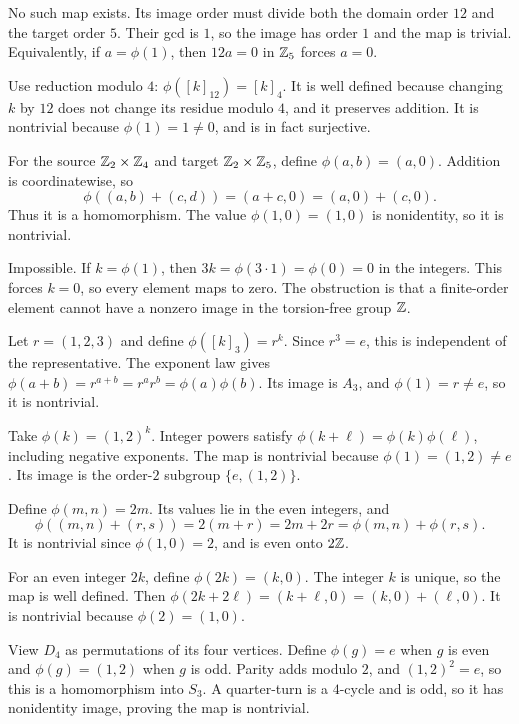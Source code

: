 No such map exists. Its image order must divide both the domain order $12$ and the target order $5$. Their gcd is $1$, so the image has order $1$ and the map is trivial. Equivalently, if $a=\phi(1)$, then $12a=0$ in $\mathbb{Z}_5$ forces $a=0$.

Use reduction modulo $4$: $\phi([k]_{12})=[k]_4$. It is well defined because changing $k$ by $12$ does not change its residue modulo $4$, and it preserves addition. It is nontrivial because $\phi(1)=1\ne0$, and is in fact surjective.

For the source $\mathbb{Z}_2\times\mathbb{Z}_4$ and target $\mathbb{Z}_2\times\mathbb{Z}_5$, define $\phi(a,b)=(a,0)$. Addition is coordinatewise, so
\[\phi((a,b)+(c,d))=(a+c,0)=(a,0)+(c,0).\]
Thus it is a homomorphism. The value $\phi(1,0)=(1,0)$ is nonidentity, so it is nontrivial.

Impossible. If $k=\phi(1)$, then $3k=\phi(3\cdot1)=\phi(0)=0$ in the integers. This forces $k=0$, so every element maps to zero. The obstruction is that a finite-order element cannot have a nonzero image in the torsion-free group $\mathbb{Z}$.

Let $r=(1,2,3)$ and define $\phi([k]_3)=r^k$. Since $r^3=e$, this is independent of the representative. The exponent law gives $\phi(a+b)=r^{a+b}=r^ar^b=\phi(a)\phi(b)$. Its image is $A_3$, and $\phi(1)=r\ne e$, so it is nontrivial.

Take $\phi(k)=(1,2)^k$. Integer powers satisfy $\phi(k+\ell)=\phi(k)\phi(\ell)$, including negative exponents. The map is nontrivial because $\phi(1)=(1,2)\ne e$. Its image is the order-$2$ subgroup $\{e,(1,2)\}$.

Define $\phi(m,n)=2m$. Its values lie in the even integers, and
\[\phi((m,n)+(r,s))=2(m+r)=2m+2r=\phi(m,n)+\phi(r,s).\]
It is nontrivial since $\phi(1,0)=2$, and is even onto $2\mathbb{Z}$.

For an even integer $2k$, define $\phi(2k)=(k,0)$. The integer $k$ is unique, so the map is well defined. Then $\phi(2k+2\ell)=(k+\ell,0)=(k,0)+(\ell,0)$. It is nontrivial because $\phi(2)=(1,0)$.

View $D_4$ as permutations of its four vertices. Define $\phi(g)=e$ when $g$ is even and $\phi(g)=(1,2)$ when $g$ is odd. Parity adds modulo $2$, and $(1,2)^2=e$, so this is a homomorphism into $S_3$. A quarter-turn is a $4$-cycle and is odd, so it has nonidentity image, proving the map is nontrivial.

